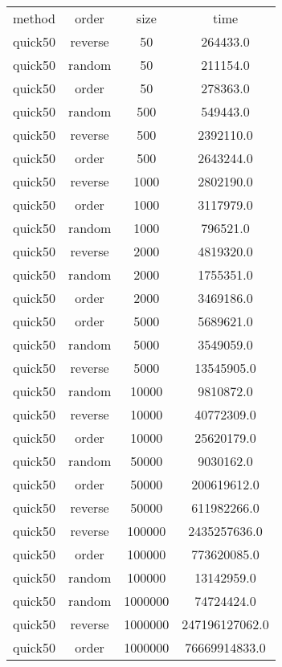 \begin{table}
\begin{tabular}{cccc}
method & order & size & time \\
quick50 & reverse & 50 & 264433.0 \\
quick50 & random & 50 & 211154.0 \\
quick50 & order & 50 & 278363.0 \\
quick50 & random & 500 & 549443.0 \\
quick50 & reverse & 500 & 2392110.0 \\
quick50 & order & 500 & 2643244.0 \\
quick50 & reverse & 1000 & 2802190.0 \\
quick50 & order & 1000 & 3117979.0 \\
quick50 & random & 1000 & 796521.0 \\
quick50 & reverse & 2000 & 4819320.0 \\
quick50 & random & 2000 & 1755351.0 \\
quick50 & order & 2000 & 3469186.0 \\
quick50 & order & 5000 & 5689621.0 \\
quick50 & random & 5000 & 3549059.0 \\
quick50 & reverse & 5000 & 13545905.0 \\
quick50 & random & 10000 & 9810872.0 \\
quick50 & reverse & 10000 & 40772309.0 \\
quick50 & order & 10000 & 25620179.0 \\
quick50 & random & 50000 & 9030162.0 \\
quick50 & order & 50000 & 200619612.0 \\
quick50 & reverse & 50000 & 611982266.0 \\
quick50 & reverse & 100000 & 2435257636.0 \\
quick50 & order & 100000 & 773620085.0 \\
quick50 & random & 100000 & 13142959.0 \\
quick50 & random & 1000000 & 74724424.0 \\
quick50 & reverse & 1000000 & 247196127062.0 \\
quick50 & order & 1000000 & 76669914833.0 \\
\end{tabular}
\end{table}
